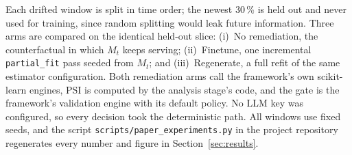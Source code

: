 \documentclass[conference]{IEEEtran}
\begin{document}
Each drifted window is split in time order; the newest 30\,\% is held out and never used for
training, since random splitting would leak future information. Three arms are compared on the
identical held-out slice: (i)~No remediation, the counterfactual in which $M_t$ keeps serving;
(ii)~Finetune, one incremental \texttt{partial\_fit} pass seeded from $M_t$; and
(iii)~Regenerate, a full refit of the same estimator configuration. Both remediation arms call
the framework's own scikit-learn engines, PSI is computed by the analysis stage's code, and the
gate is the framework's validation engine with its default policy. No LLM key was configured, so
every decision took the deterministic path. All windows use fixed seeds, and the script
\texttt{scripts/paper\_experiments.py} in the project repository regenerates every number and
figure in Section~\ref{sec:results}.

\begin{table}[t]
\centering
\caption{Drift Scenarios and the Measured Shift Severity}
\label{tab:scen}
\footnotesize
\setlength{\tabcolsep}{3.2pt}
\end{table}
\end{document}
